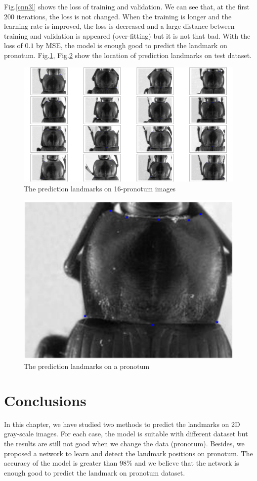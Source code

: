 \documentclass[12pt,a4paper]{article}
\begin{document}
Fig.\ref{cnn3l} shows the loss of training and validation. We can see that, at the first 200 iterations, the loss is not changed. When the training is longer and the learning rate is improved, the loss is decreased and a large distance between training and validation is appeared (over-fitting) but it is not that bad. With the loss of $0.1$ by MSE, the model is enough good to predict the landmark on pronotum. Fig.\ref{cnn3t}, Fig.\ref{cnn3t1} show the location of prediction landmarks on test dataset.
\begin{figure}[h!]
	\centering
	\includegraphics[scale=0.3]{images/figure_1_cnn3_3000_2}
	\caption{The prediction landmarks on 16-pronotum images}
	\label{cnn3t}
\end{figure}
\begin{figure}[h!]
	\centering
	\includegraphics[scale=0.3]{images/plandmark}
	\caption{The prediction landmarks on a pronotum}
	\label{cnn3t1}
\end{figure}
\section{Conclusions}
In this chapter, we have studied two methods to predict the landmarks on 2D gray-scale images. For each case, the model is suitable with different dataset but the results are still not good when we change the data (pronotum). Besides, we proposed a network to learn and detect the landmark positions on pronotum. The accuracy of the model is greater than $98 \%$ and we believe that the network is enough good to predict the landmark on pronotum dataset.


\end{document}

